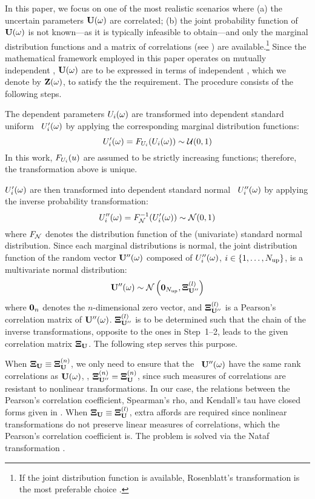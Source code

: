 In this paper, we focus on one of the most realistic scenarios where (a) the uncertain parameters $\mathbf{U}(\omega)$ are correlated; (b) the joint probability function of $\mathbf{U}(\omega)$ is not known---as it is typically infeasible to obtain---and only the marginal distribution functions and a matrix of correlations (see ) are available.\footnote{If the joint distribution function is available, Rosenblatt's transformation is the most preferable choice \cite{rosenblatt1952}.} Since the mathematical framework employed in this paper operates on mutually independent \rvs, $\mathbf{U}(\omega)$ are to be expressed in terms of independent \rvs, which we denote by $\mathbf{Z}(\omega)$, to satisfy the the requirement. The procedure consists of the following steps.

 The dependent parameters $U_i(\omega)$ are transformed into dependent standard uniform \rvs\ $U'_i(\omega)$ by applying the corresponding marginal distribution functions:
\begin{equation} \elabel{dependent-uniform}
  \U'_i(\o) = \CDF_{\U_i}(\U_i(\o)) \sim \uniform(0, 1)
\end{equation}
In this work, $F_{U_i}(u)$ are assumed to be strictly increasing functions; therefore, the transformation above is unique.

 $U'_i(\omega)$ are then transformed into dependent standard normal \rvs\ $U''_i(\omega)$ by applying the inverse probability transformation:
\begin{equation} \elabel{dependent-normal}
  \U''_i(\o) = \CDF^{-1}_\normal(\U'_i(\o)) \sim \normal(0, 1)
\end{equation}
where $F_{\mathcal{N}}$ denotes the distribution function of the (univariate) standard normal distribution. Since each marginal distributions is normal, the joint distribution function of the random vector $\mathbf{U}''(\omega)$ composed of $U''_i(\omega)$, $i \in \{ 1, \dots, {N_\text{up}} \}$, is a multivariate normal distribution:
\[
  \mathbf{U}''(\omega) \sim \mathcal{N} \left( \mathbf{0}_{N_\text{up}}, \mathbf{\Xi}^{(l)}_{\mathbf{U}''} \right)
\]
where $\mathbf{0}_n$ denotes the $n$-dimensional zero vector, and $\mathbf{\Xi}^{(l)}_{\mathbf{U}''}$ is a Pearson's correlation matrix of $\mathbf{U}''(\omega)$. $\mathbf{\Xi}^{(l)}_{\mathbf{U}''}$ is to be determined such that the chain of the inverse transformations, opposite to the ones in Step~1--2, leads to the given correlation matrix $\mathbf{\Xi}_{\mathbf{U}}$. The following step serves this purpose.

 When $\mathbf{\Xi}_{\mathbf{U}} \equiv \mathbf{\Xi}^{(n)}_{\mathbf{U}}$, we only need to ensure that the \rvs\ $\mathbf{U}''(\omega)$ have the same rank correlations as $\mathbf{U}(\omega)$, \ie, $\mathbf{\Xi}^{(n)}_{\mathbf{U}''} = \mathbf{\Xi}^{(n)}_{\mathbf{U}}$, since such measures of correlations are resistant to nonlinear transformations. In our case, the relations between the Pearson's correlation coefficient, Spearman's rho, and Kendall's tau have closed forms given in . When $\mathbf{\Xi}_{\mathbf{U}} \equiv \mathbf{\Xi}^{(l)}_{\mathbf{U}}$, extra affords are required since nonlinear transformations do not preserve linear measures of correlations, which the Pearson's correlation coefficient is. The problem is solved via the Nataf transformation \cite{li2008}.

